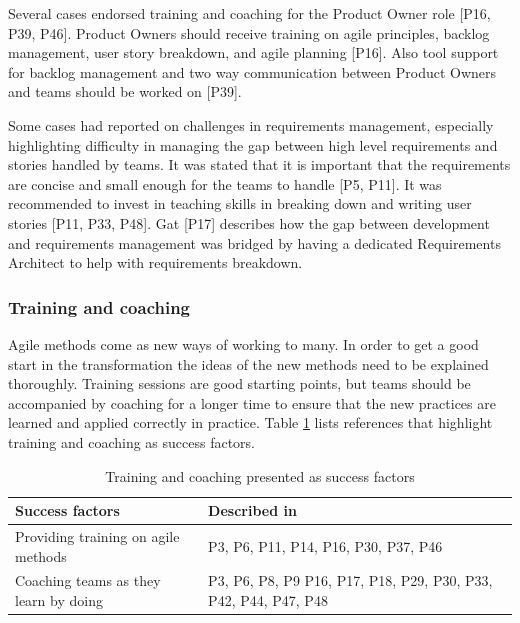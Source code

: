 Several cases endorsed training and coaching for the Product Owner role [P16,
P39, P46]. Product Owners should receive training on agile principles, backlog
management, user story breakdown, and agile planning [P16]. Also tool support
for backlog management and two way communication between Product Owners and
teams should be worked on [P39].


Some cases had reported on challenges in requirements management, especially
highlighting difficulty in managing the gap between high level requirements and
stories handled by teams. It was stated that it is important that the
requirements are concise and small enough for the teams to handle [P5, P11].
It was recommended to invest in teaching skills in breaking down and writing
user stories [P11, P33, P48]. Gat [P17] describes how the gap between
development and requirements management was bridged by having a dedicated
Requirements Architect to help with requirements breakdown.


\subsubsection{Training and coaching}

Agile methods come as new ways of working to many. In order to get a good start
in the transformation the ideas of the new methods need to be explained
thoroughly. Training sessions are good starting points, but teams should be
accompanied by coaching for a longer time to ensure that the new practices are
learned and applied correctly in practice. Table \ref{table:success_training}
lists references that highlight training and coaching as success factors.

\begin{table}[h]
    \centering
    \begin{tabular}{ >{\raggedright\arraybackslash}p{}
                     >{\raggedright\arraybackslash}p{} }
        \toprule
        Success factors  &  Described in \\
        \midrule
        Providing training on agile methods  &
                P3, P6, P11, P14, P16, P30, P37, P46 \\
        Coaching teams as they learn by doing  &
                P3, P6, P8, P9 P16, P17, P18, P29,
                P30, P33, P42, P44, P47, P48  \\
        \bottomrule
    \end{tabular}
    \caption{Training and coaching presented as success factors}
    \label{table:success_training}
\end{table}

